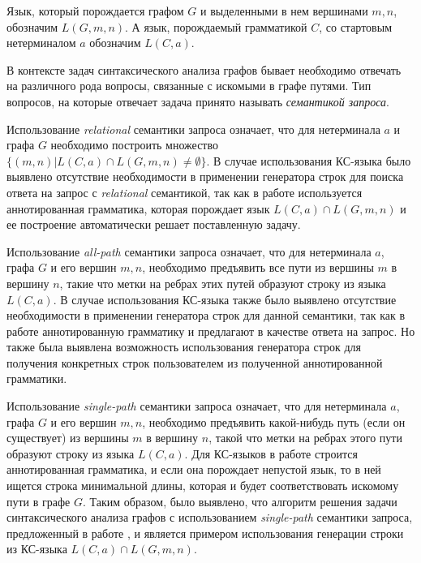 \documentclass[10pt]{article}
\begin{document}
Язык, который порождается графом $G$ и выделенными в нем вершинами $m, n$, обозначим $L(G, m, n)$. А язык, порождаемый грамматикой $C$, со стартовым нетерминалом $a$ обозначим $L(C,a)$.

В контексте задач синтаксического анализа графов бывает необходимо отвечать на различного рода вопросы, связанные с искомыми в графе путями. Тип вопросов, на которые отвечает задача принято называть \emph{семантикой запроса}.

Использование \emph{relational} семантики запроса означает, что для нетерминала $a$ и графа $G$ необходимо построить множество $\{(m, n)|L(C,a) \cap L(G,m,n) \neq \emptyset \}$. В случае использования КС-языка было выявлено отсутствие необходимости в применении генератора строк для поиска ответа на запрос с \emph{relational} семантикой, так как в работе \cite{azimov-spbu-hellings2} используется аннотированная грамматика, которая порождает язык $L(C,a) \cap L(G,m,n)$ и ее построение автоматически решает поставленную задачу.

Использование \emph{all-path} семантики запроса означает, что для нетерминала $a$, графа $G$ и его вершин $m,n$, необходимо предъявить все пути из вершины $m$ в вершину $n$, такие что метки на ребрах этих путей образуют строку из языка $L(C,a)$. В случае использования КС-языка также было выявлено отсутствие необходимости в применении генератора строк для данной семантики, так как в работе \cite{azimov-spbu-hellings2} аннотированную грамматику и предлагают в качестве ответа на запрос. Но также была выявлена возможность использования генератора строк для получения конкретных строк пользователем из полученной аннотированной грамматики.

Использование \emph{single-path} семантики запроса означает, что для нетерминала $a$, графа $G$ и его вершин $m,n$, необходимо предъявить какой-нибудь путь (если он существует) из вершины $m$ в вершину $n$, такой что метки на ребрах этого пути образуют строку из языка $L(C,a)$. Для КС-языков в работе \cite{azimov-spbu-hellings2} строится аннотированная грамматика, и если она порождает непустой язык, то в ней ищется строка минимальной длины, которая и будет соответствовать искомому пути в графе $G$. Таким образом, было выявлено, что алгоритм решения задачи синтаксического анализа графов с использованием \emph{single-path} семантики запроса, предложенный в работе \cite{azimov-spbu-hellings2}, и является примером использования генерации строки из КС-языка $L(C,a) \cap L(G,m,n)$.
\end{document}
